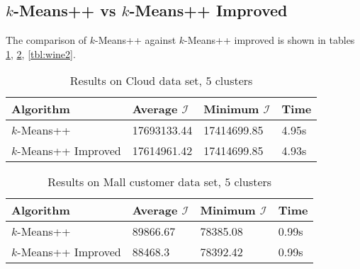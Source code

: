 \documentclass[twoside, 11pt]{article}
\newcommand{\I}{\mathcal{I}}
\begin{document}
	\subsection{$k$-Means++ vs $k$-Means++ Improved}
	The comparison of $k$-Means++ against $k$-Means++ improved is shown in tables \ref{tbl:cloud}, \ref{tbl:mall2}, \ref{tbl:wine2}.
		\begin{table}
			\begin{center}
				\begin{tabular}{|l|l|l|l|}
					\hline
					Algorithm & Average $\I$& Minimum $\I$& Time\\\hline
					$k$-Means++ & 17693133.44& 17414699.85& 4.95s\\\hline
					$k$-Means++ Improved& 17614961.42& 17414699.85& 4.93s\\\hline
				\end{tabular}
				\caption{Results on Cloud data set, $5$ clusters}
				\label{tbl:cloud}
			\end{center}
		\end{table}
	
		\begin{table}
			\begin{center}
				\begin{tabular}{|l|l|l|l|}
					\hline
					Algorithm & Average $\I$& Minimum $\I$& Time\\\hline
					$k$-Means++ & 89866.67& 78385.08& 0.99s\\\hline
					$k$-Means++ Improved& 88468.3& 78392.42& 0.99s\\\hline
				\end{tabular}
				\caption{Results on Mall customer data set, $5$ clusters}
				\label{tbl:mall2}
			\end{center}
		\end{table}
	
\end{document}
